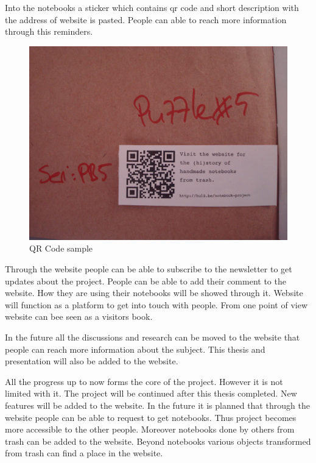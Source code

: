 Into the notebooks a sticker which contains qr code and short description with the address of website is pasted. People can able to reach more information through this reminders. 

\begin{figure}[h!]
  \centering
  \includegraphics[width=1\textwidth]{project_graphics/qr_serial.jpg}
  \caption{QR Code sample}
  \label{fig:Banner_1}
\end{figure}

Through the website people can be able to subscribe to the newsletter to get updates about the project. People can be able to add their comment to the website. How they are using their notebooks will be showed through it. Website will function as a platform to get into touch with people. From one point of view website can bee seen as a visitors book.

In the future all the discussions and research can be moved to the website that people can reach more information about the subject. This thesis and presentation will also be added to the website. 

All the progress up to now forms the core of the project. However it is not limited with it. The project will be continued after this thesis completed. New features will be added to the website. In the future it is planned that through the website people can be able to request to get notebooks. Thus project becomes more accessible to the other people. Moreover notebooks done by others from trash can be added to the website. Beyond notebooks various objects transformed from trash can find a place in the website.

